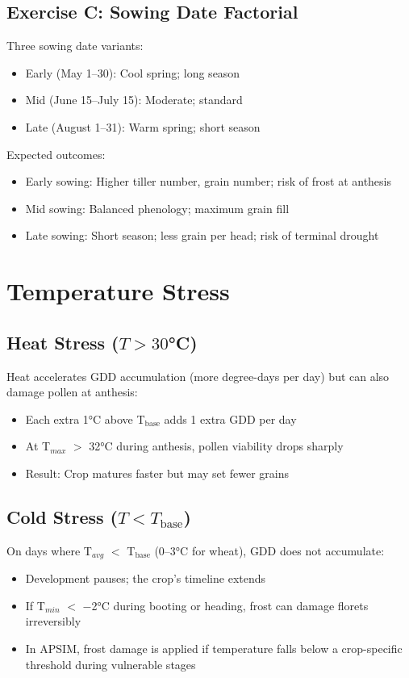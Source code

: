 \subsection{Exercise C: Sowing Date Factorial}

Three sowing date variants:
\begin{itemize}
  \item Early (May 1--30): Cool spring; long season
  \item Mid (June 15--July 15): Moderate; standard
  \item Late (August 1--31): Warm spring; short season
\end{itemize}

Expected outcomes:
\begin{itemize}
  \item Early sowing: Higher tiller number, grain number; risk of frost at anthesis
  \item Mid sowing: Balanced phenology; maximum grain fill
  \item Late sowing: Short season; less grain per head; risk of terminal drought
\end{itemize}

\section{Temperature Stress}

\subsection{Heat Stress ($T > 30$°C)}

Heat accelerates GDD accumulation (more degree-days per day) but can also damage pollen at anthesis:
\begin{itemize}
  \item Each extra 1°C above T$_\text{base}$ adds 1 extra GDD per day
  \item At T$_{max}$ $>$ 32°C during anthesis, pollen viability drops sharply
  \item Result: Crop matures faster but may set fewer grains
\end{itemize}

\subsection{Cold Stress ($T < T_\text{base}$)}

On days where T$_{avg}$ $<$ T$_\text{base}$ (0--3°C for wheat), GDD does not accumulate:
\begin{itemize}
  \item Development pauses; the crop's timeline extends
  \item If T$_{min}$ $<$ $-$2°C during booting or heading, frost can damage florets irreversibly
  \item In APSIM, frost damage is applied if temperature falls below a crop-specific threshold during vulnerable stages
\end{itemize}

